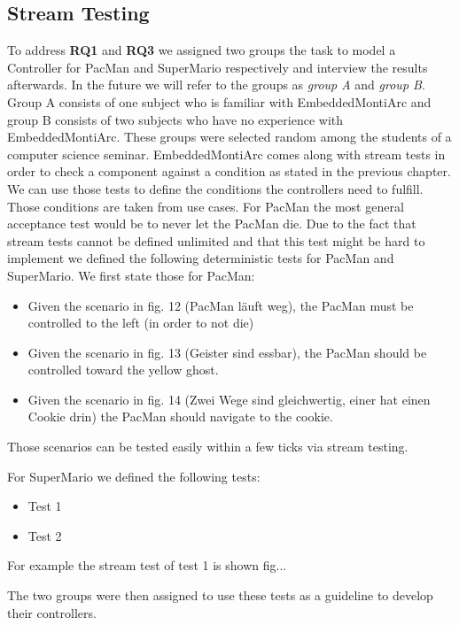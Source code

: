 \subsection{Stream Testing}
To address \textbf{RQ1} and \textbf{RQ3} we assigned two groups the task to model a Controller for PacMan and SuperMario respectively and interview the results afterwards. In the future we will refer to the groups as \textit{group A} and \textit{group B}. Group A consists of one subject who is familiar with EmbeddedMontiArc and group B consists of two subjects who have no experience with EmbeddedMontiArc. These groups were selected random among the students of a computer science seminar. 
EmbeddedMontiArc comes along with stream tests in order to check a component against a condition as stated in the previous chapter.
We can use those tests to define the conditions the controllers need to fulfill. Those conditions are taken from use cases. For PacMan the most general acceptance test would be to never let the PacMan die. Due to the fact that stream tests cannot be defined unlimited and that this test might be hard to implement we defined the following deterministic tests for PacMan and SuperMario. We first state those for PacMan:

\begin{itemize}
	\item Given the scenario in fig. 12 (PacMan läuft weg), the PacMan must be controlled to the left (in order to not die)
	\item Given the scenario in fig. 13 (Geister sind essbar), the PacMan should be controlled toward the yellow ghost.
	\item Given the scenario in fig. 14 (Zwei Wege sind gleichwertig, einer hat einen Cookie drin) the PacMan should navigate to the cookie.
\end{itemize}

Those scenarios can be tested easily within a few ticks via stream testing.

For SuperMario we defined the following tests:
\begin{itemize}
	\item Test 1
	\item Test 2
\end{itemize}
For example the stream test of test 1 is shown fig...

The two groups were then assigned to use these tests as a guideline to develop their controllers.

